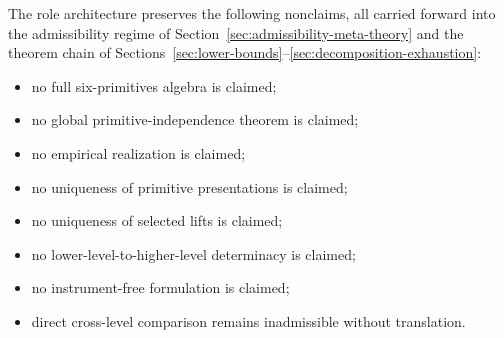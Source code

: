 \begin{remark}\label{rem:atlas-global-nonclaims}
The role architecture preserves the following nonclaims, all carried
forward into the admissibility regime of
Section~\ref{sec:admissibility-meta-theory} and the theorem chain of
Sections~\ref{sec:lower-bounds}--\ref{sec:decomposition-exhaustion}:
\begin{itemize}[topsep=2pt,itemsep=1pt]
  \item no full six-primitives algebra is claimed;
  \item no global primitive-independence theorem is claimed;
  \item no empirical realization is claimed;
  \item no uniqueness of primitive presentations is claimed;
  \item no uniqueness of selected lifts is claimed;
  \item no lower-level-to-higher-level determinacy is claimed;
  \item no instrument-free formulation is claimed;
  \item direct cross-level comparison remains inadmissible without
    translation.
\end{itemize}
\end{remark}